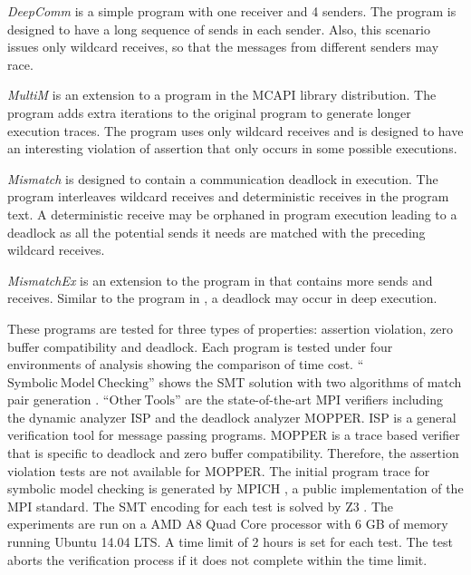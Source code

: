 \begin{compactitem}
\item \textit{DeepComm} is a simple program with one receiver and 4 senders. The program is designed to have a long sequence of sends in each sender.
Also, this scenario issues only wildcard receives, so that the messages from different senders may race.

\item \textit{MultiM} is an extension to a program in the MCAPI library distribution.
The program adds extra iterations to the original program to generate longer execution traces. The program uses only wildcard receives and is designed to have an interesting violation of assertion that only occurs in some possible executions.

\item \textit{Mismatch} is designed to contain a communication deadlock in execution. The program interleaves wildcard receives and deterministic receives in the program text. A deterministic receive may be orphaned in program execution leading to a deadlock as all the potential sends it needs are matched with the preceding wildcard receives. 

\item \textit{MismatchEx} is an extension to the program in  that contains more sends and receives. Similar to the program in , a deadlock may occur in deep execution. 
\end{compactitem}


These programs are tested for three types of properties: assertion violation, zero buffer compatibility and deadlock. 
Each program is tested under four environments of analysis showing the comparison of time cost. 
``$\mathrm{Symbolic\ Model\ Checking}$'' shows the SMT solution with two algorithms of match pair generation .
``$\mathrm{Other\ Tools}$'' are the state-of-the-art MPI verifiers including the dynamic analyzer ISP \cite{DBLP:conf/ppopp/VakkalankaSGK08} and the deadlock analyzer MOPPER\cite{DBLP:conf/fm/ForejtKNS14,DBLP:journals/toplas/ForejtJKNS17}. 
ISP is a general verification tool for message passing programs.
MOPPER is a trace based verifier that is specific to deadlock and zero buffer compatibility. Therefore, the assertion violation tests are not available for MOPPER.
The initial program trace for symbolic model checking is generated by MPICH \cite{mpich}, a public implementation of the MPI standard.
The SMT encoding for each test 
is solved by Z3 \cite{demoura:tacas08}. 
The experiments are run on a AMD A8 Quad Core processor with 6 GB of memory running Ubuntu 14.04 LTS. 
A time limit of 2 hours is set for each test. The test aborts the verification process if it does not complete within the time limit.

